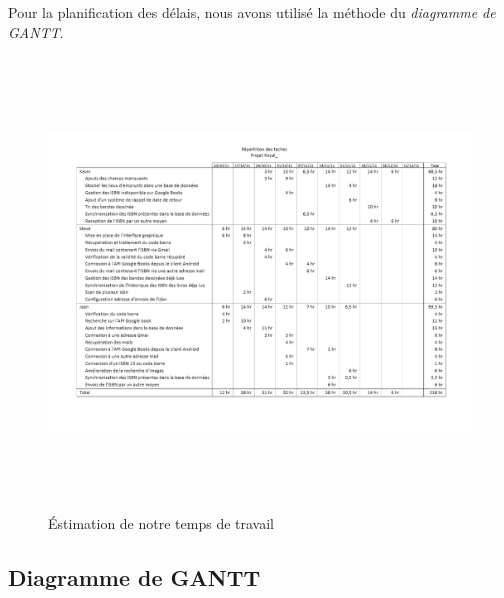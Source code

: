 Pour la planification des délais, nous avons utilisé la méthode du \emph{diagramme de GANTT}.
\begin{figure}[h]
\begin{center}
\includegraphics[height=12cm]{../repartition_des_taches.png}
\end{center}
\caption{Éstimation de notre temps de travail}
\end{figure}
\subsection{Diagramme de GANTT}

